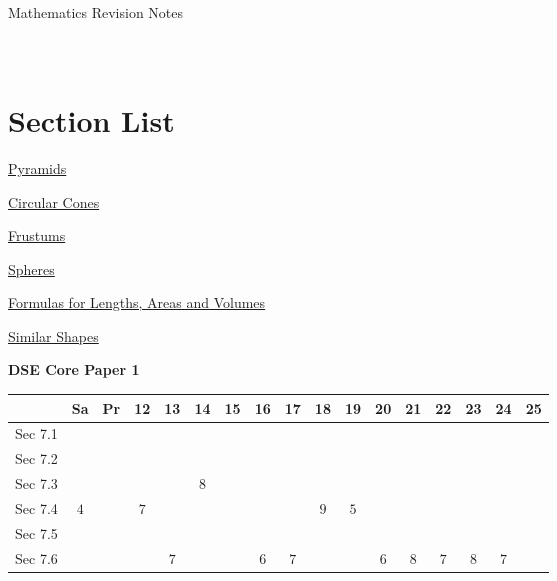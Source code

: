 \documentclass[12pt, a4paper]{article}
\begin{document}
\newpage
\newpage
\thispagestyle{empty}
\begin{center}
Mathematics Revision Notes\\\vspace{1cm}
\\\vspace{1cm}
{\fontsize{24pt}{24pt}\selectfont {Areas and Volumes (III)}} \\\vspace{1cm}
\label{chapter:S3-7}

\end{center}
\vspace{0.5cm}
\hline
\section*{Section List}
\begin{enumx}[label=Sec 7.\arabic*\ ]
\item \hyperref[section:3-7-1]{Pyramids}
\item \hyperref[section:3-7-2]{Circular Cones}
\item \hyperref[section:3-7-3]{Frustums}
\item \hyperref[section:3-7-4]{Spheres}
\item \hyperref[section:3-7-5]{Formulas for Lengths, Areas and Volumes}
\item \hyperref[section:3-7-6]{Similar Shapes}
\end{enumx}
\begin{absolutelynopagebreak}
\begin{center}
\textbf{DSE Core Paper 1}
\end{center}
\begin{center}
\begin{tabular}{|l|c|c|c|c|c|c|c|c|c|c|c|c|c|c|c|c|}
\hline
        & Sa & Pr & 12 & 13 & 14 & 15 & 16 & 17 & 18 & 19 & 20 & 21 & 22 & 23 & 24 & 25 \\\hline\hline
Sec 7.1 &  &  &  &  &  &  &  &  &  &  &  &  &  &  &  &  \\\hline
Sec 7.2 &  &  &  &  &  &  &  &  &  &  &  &  &  &  &  &  \\\hline
Sec 7.3 &  &  &  &  &  $8$ &  &  &  &  &  &  &  &  &  &  &  \\\hline
Sec 7.4 &  $4$ &  &  $7$ &  &  &  &  &  &  $9$ &  $5$ &  &  &  &  &  &  \\\hline
Sec 7.5 &  &  &  &  &  &  &  &  &  &  &  &  &  &  &  &  \\\hline
Sec 7.6 &  &  &  &  $7$ &  &  &  $6$ &  $7$ &  &  &  $6$ &  $8$ &  $7$ &  $8$ &  $7$ &  \\\hline
\end{tabular}
\end{center}
\end{absolutelynopagebreak}
\end{document}
